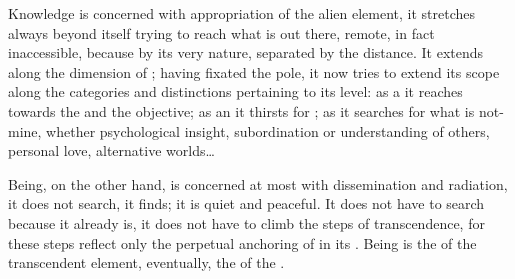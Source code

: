 Knowledge is concerned with appropriation of the alien element, it stretches
always beyond itself trying to reach what is out there, remote, in fact
inaccessible, because by its very nature, separated by the distance.  It extends
along the  dimension of ; having fixated the
 pole, it now tries to extend its scope along the categories and
distinctions pertaining to its level: as a  it reaches towards the
 and the objective; as an  it thirsts for ; as
 it searches for what is not-mine, whether psychological insight,
subordination or understanding of others, personal love, alternative worlds\ldots

Being, on the other hand, is concerned at most with dissemination and radiation,
it does not search, it finds; it is quiet and peaceful. It does not have to
search because it already is, it does not have to climb the  steps
of transcendence, for these steps reflect only the perpetual anchoring of
 in its .  Being is the  of the
 transcendent element, eventually, the  of the
.


